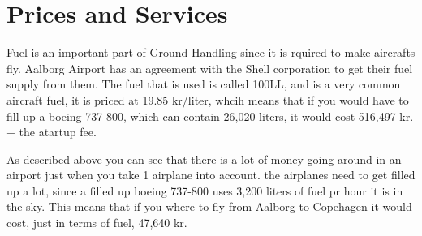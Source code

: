 \section{Prices and Services}

Fuel is an important part of Ground Handling since it is rquired to make aircrafts fly. Aalborg Airport has an agreement with the Shell corporation to get their fuel supply from them. The fuel that is used is called 100LL, and is a very common aircraft fuel, it is priced at 19.85 kr/liter, whcih means that if you would have to fill up a boeing 737-800, which can contain 26,020 liters, it would cost 516,497 kr. + the atartup fee.

As described above you can see that there is a lot of money going around in an airport just when you take 1 airplane into account. the airplanes need to get filled up a lot, since a filled up boeing 737-800 uses 3,200 liters of fuel pr hour it is in the sky. This means that if you where to fly from Aalborg to Copehagen it would cost, just in terms of fuel, 47,640 kr.

